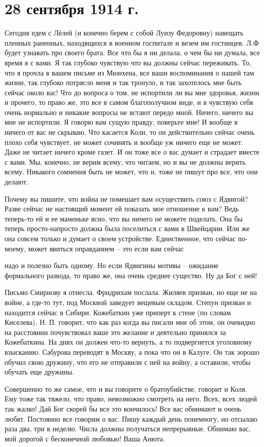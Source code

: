\section{28 сентября 1914 г.}


Сегодня едем с Лёлей (и конечно берем с собой Луизу Федоровну) навещать
пленных раненных, находящихся в военном госпитале и везем им гостинцев. Л.Ф
будет узнавать про своего брата. Все что бы я ни делала, о чем бы ни думала,
все время я с вами. Я так глубоко чувствую что вы должны сейчас переживать. То,
что я прочла в вашем письме из Мюнхена, все ваши воспоминания о нашей там
жизни, так глубоко потрясло меня и так тронуло, и так захотелось мне быть
сейчас около вас! Что до вопроса о том, не испортили ли вы мне здоровья, жизни
и прочего, то право же, это все в самом благополучном виде, и я чувствую себя
очень нормально и никакие вопросы не встают передо мной. Ничего, ничего вы мне
не испортили. Я говорю вам сущую правду, поверьте мне! И вообще я ничего от вас
не скрываю. Что касается Коли, то он действительно сейчас очень плохо себя
чувствует, не может сочинять и вообще уж ничего еще не может. Даже не читает
ничего кроме газет. И он тоже все о вас думает и страдает вместе с вами. Мы,
конечно, не верим всему, что читаем, но и вы не должны верить всему. Никакого
сомнения быть не может, что н. тоже не пишут про все, что они делают.

Почему вы пишите, что война не помешает вам осуществить союз с Ядвигой? Разве
сейчас не настоящий момент ей показать мое отношение к вам? Ведь теперь-то ей и
ее маменьке ясно, что вы ничего не можете поделать. Она бы теперь
просто-напросто должна была поселиться с вами в Швейцарии. Или же она совсем
только и думает о своем устройстве. Единственное, что сейчас по-моему, может
явиться оправданием -- это если вам сейчас


\noindent
надо и полезно быть одному. Но если Ядвигины мотивы -- ожидание формального
развода, то право же, она очень среднее существо. Ну да Бог с ней!

Письмо Смирнову я отнесла. Фридрихам послала. Жиляев призван, но еще не на
войне, а где-то тут, под Москвой заведует вещевым складом. Степун призван и
находится сейчас в Сибири. Кожебаткин уже приперт к стене (по словам
Киселева). Н. П. говорит, что как раз когда вы писали мне об этом, он очевидно
на расстоянии почувствовал ваше это желание и деятельно принялся за
Кожебаткина. На днях он должен что-то вернуть, а то подвергнется уголовному
взысканию. Сабурова переводят в Москву, а пока что он в Калуге. Он так зорошо
обучил свою дружину, что его не отправили с ней на войну, а оставили, чтобы
обучать еще дружины.

Совершенно то же самое, что и вы говорите о братоубийстве, говорит и Коля. Ему
тоже так тяжело, что право, невозможно смотреть на него. Всех, всех людей так
жалко! Дай Бог скорей бы все это кончилось! Все вас обнимают и очень любят.
Постоянно все говорим о вас. Пишу каждый день понемногу, но отсылаю раза два,
три в неделю. Числа должны получаться непрерывные. Обнимаю вас, мой дорогой с
бесконечной любовью! Ваша Анюта.
